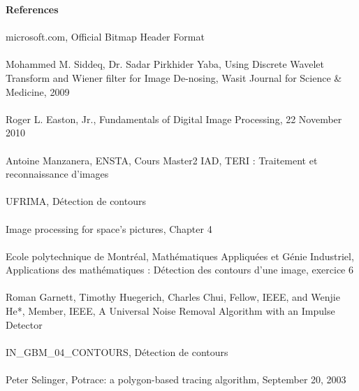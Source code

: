 \documentclass{article}
\begin{document}
	
	\textbf{References}\\\\\-
	[1] microsoft.com, Official Bitmap Header Format\\\\\-
	[2] Mohammed M. Siddeq, Dr. Sadar Pirkhider Yaba, Using Discrete Wavelet Transform and Wiener filter for
Image De-nosing, Wasit Journal for Science \& Medicine, 2009\\\\\-
	[3] Roger L. Easton, Jr., Fundamentals of Digital Image Processing, 22 November 2010\\\\\-
	[4] Antoine Manzanera, ENSTA, Cours Master2 IAD, TERI : Traitement et
reconnaissance d'images\\\\\-
	[5] UFRIMA, Détection de contours\\\\\-
	[6] Image processing for space's pictures, Chapter 4\\\\\-
	[7] Ecole polytechnique de Montréal, Mathématiques Appliquées et Génie Industriel, Applications des mathématiques : Détection des contours d’une image, exercice 6\\\\\-
	[8] Roman Garnett, Timothy Huegerich, Charles Chui, Fellow, IEEE, and Wenjie He*, Member, IEEE, A Universal Noise Removal Algorithm with an Impulse Detector\\\\\-
	[9] IN\_GBM\_04\_CONTOURS, Détection de contours\\\\\-
	[10] Peter Selinger, Potrace: a polygon-based tracing algorithm, September 20, 2003\\\\\-
\end{document}
